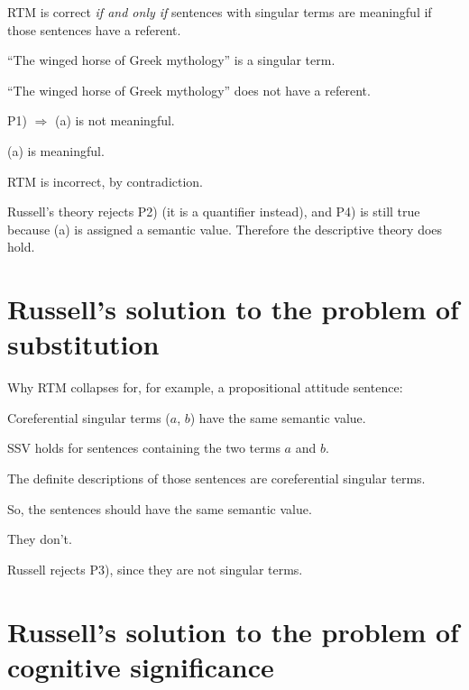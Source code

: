 \begin{argument}\leavevmode
\begin{premises}
  \item[P1)] RTM is correct \emph{if and only if} sentences with singular terms are meaningful if those sentences have a referent.
  \item[P2)] ``The winged horse of Greek mythology'' is a singular term.
  \item[P3)] ``The winged horse of Greek mythology'' does not have a referent.
  \item[C1)] P1) $\Rightarrow$ (a) is not meaningful.
  \item[P4)] (a) is meaningful.
  \item[C2)] RTM is incorrect, by contradiction.
\end{premises}
\end{argument}

Russell's theory rejects P2) (it is a quantifier instead), and P4) is still true because (a) is assigned a semantic value. Therefore the descriptive theory does hold.

\section{Russell's solution to the problem of substitution}

Why RTM collapses for, for example, a propositional attitude sentence:

\begin{argument}\leavevmode
\begin{premises}
  \item[P1)] Coreferential singular terms ($a$, $b$) have the same semantic value.
  \item[P2)] SSV holds for sentences containing the two terms $a$ and $b$.
  \item[P3)] The definite descriptions of those sentences are coreferential singular terms.
  \item[C1)] So, the sentences should have the same semantic value.
  \item[P4)] They don't.
\end{premises}
\end{argument}

Russell rejects P3), since they are not singular terms.

\section{Russell's solution to the problem of cognitive significance}

